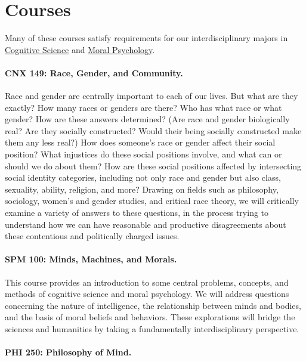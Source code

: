\documentclass[%
  11pt,%
]{article}
\let\oldparagraph\paragraph
\renewcommand\paragraph[1]{\oldparagraph{\textcolor{myblue}{#1}}}
\begin{document}
\section{Courses}

Many of these courses satisfy requirements for our interdisciplinary majors in \href{https://www.fandm.edu/fields-of-study/cognitive-science/index.html}{Cognitive Science} and \href{https://www.fandm.edu/fields-of-study/moral-psychology/index.html}{Moral Psychology}.
\medskip{}

\paragraph{CNX 149: Race, Gender, and Community.}

Race and gender are centrally important to each of our lives. But what are they exactly? How many races or genders are there? Who has what race or what gender? How are these answers determined? (Are race and gender biologically real? Are they socially constructed? Would their being socially constructed make them any less real?) How does someone's race or gender affect their social position? What injustices do these social positions involve, and what can or should we do about them? How are these social positions affected by intersecting social identity categories, including not only race and gender but also class, sexuality, ability, religion, and more? Drawing on fields such as philosophy, sociology, women's and gender studies, and critical race theory, we will critically examine a variety of answers to these questions, in the process trying to understand how we can have reasonable and productive disagreements about these contentious and politically charged issues.

\paragraph{SPM 100: Minds, Machines, and Morals.}

This course provides an introduction to some central problems, concepts, and methods of cognitive science and moral psychology. We will address questions concerning the nature of intelligence, the relationship between minds and bodies, and the basis of moral beliefs and behaviors. These explorations will bridge the sciences and humanities by taking a fundamentally interdisciplinary perspective.

\paragraph{PHI 250: Philosophy of Mind.}
\end{document}

